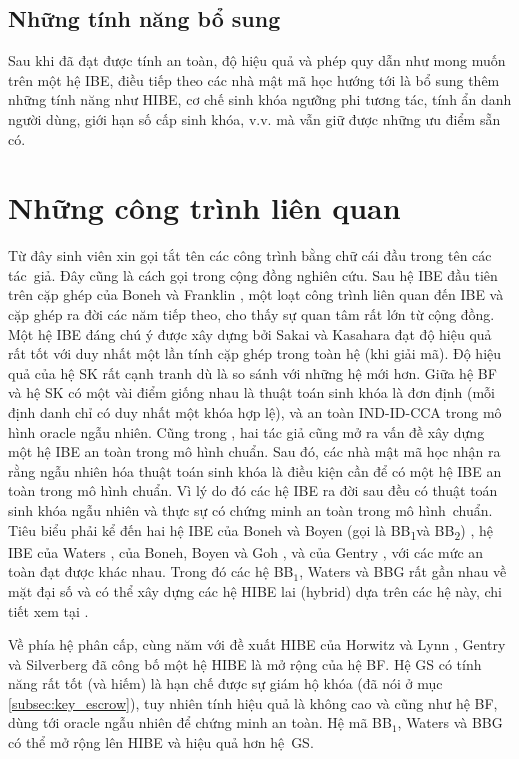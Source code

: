\documentclass[class=report, crop=false]{standalone}
\begin{document}
		\subsection{Những tính năng bổ sung}
			Sau khi đã đạt được tính an toàn, độ hiệu quả và phép quy dẫn như mong muốn trên một hệ IBE, điều tiếp theo các nhà mật mã học hướng tới là bổ sung thêm những tính năng như HIBE, cơ chế sinh khóa ngưỡng phi tương tác, tính ẩn danh người dùng, giới hạn số cấp sinh khóa, v.v. mà vẫn giữ được những ưu điểm sẵn có.
		
	\newpage
	\section{Những công trình liên quan}\label{chap:2.related_works}
		Từ đây sinh viên xin gọi tắt tên các công trình bằng chữ cái đầu trong tên các tác~giả. Đây cũng là cách gọi trong cộng đồng nghiên cứu. Sau hệ IBE đầu tiên trên cặp ghép của Boneh và Franklin \cite{DBLP:conf/crypto/BonehF01}, một loạt công trình liên quan đến IBE và cặp ghép ra đời các năm tiếp theo, cho thấy sự quan tâm rất lớn từ cộng đồng. Một hệ IBE đáng chú ý được xây dựng bởi Sakai và Kasahara \cite{DBLP:journals/iacr/SakaiK03} đạt độ hiệu quả rất tốt với duy nhất một lần tính cặp ghép trong toàn hệ (khi giải mã). Độ hiệu quả của hệ SK rất cạnh tranh dù là so sánh với những hệ mới hơn. Giữa hệ BF và hệ SK có một vài điểm giống nhau là thuật toán sinh khóa là đơn định (mỗi định danh chỉ có duy nhất một khóa hợp lệ), và an toàn IND-ID-CCA trong mô hình oracle ngẫu nhiên. Cũng trong \cite{DBLP:conf/crypto/BonehF01}, hai tác giả cũng mở ra vấn đề xây dựng một hệ IBE an toàn trong mô hình chuẩn. Sau đó, các nhà mật mã học nhận ra rằng ngẫu nhiên hóa thuật toán sinh khóa là điều kiện cần để có một hệ IBE an toàn trong mô hình chuẩn. Vì lý do đó các hệ IBE ra đời sau đều có thuật toán sinh khóa ngẫu nhiên và thực sự có chứng minh an toàn trong mô hình~chuẩn. Tiêu biểu phải kể đến hai hệ IBE của Boneh và Boyen (gọi là BB\textsubscript{1}và BB\textsubscript{2}) \cite{DBLP:journals/joc/BonehB11}, hệ IBE của Waters \cite{DBLP:conf/eurocrypt/Waters05}, của Boneh, Boyen và Goh \cite{DBLP:conf/eurocrypt/BonehBG05}, và của Gentry \cite{DBLP:conf/eurocrypt/Gentry06}, với các mức an toàn đạt được khác nhau. Trong đó các hệ BB$_1$, Waters và BBG rất gần nhau về mặt đại số và có thể xây dựng các hệ HIBE lai (hybrid) dựa trên các hệ này, chi tiết xem tại \cite[mục 4.2]{DBLP:conf/eurocrypt/BonehBG05}.

		Về phía hệ phân cấp, cùng năm với đề xuất HIBE của Horwitz và Lynn \cite{DBLP:conf/eurocrypt/HorwitzL02}, Gentry và Silverberg \cite{DBLP:conf/asiacrypt/GentryS02} đã công bố một hệ HIBE là mở rộng của hệ BF. Hệ GS có tính năng rất tốt (và hiếm) là hạn chế được sự giám hộ khóa (đã nói ở mục \ref{subsec:key_escrow}), tuy nhiên tính hiệu quả là không cao và cũng như hệ BF, dùng tới oracle ngẫu nhiên để chứng minh an toàn. Hệ mã BB$_1$, Waters và BBG có thể mở rộng lên HIBE và hiệu quả hơn hệ~GS.
\end{document}
